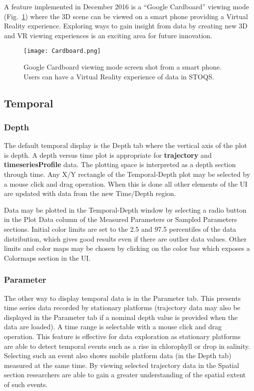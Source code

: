 \documentclass[conference]{IEEEtran}
\begin{document}
A feature implemented in December 2016 is a ``Google Cardboard'' viewing mode
(Fig.~\ref{fig:Cardboard}) where the 3D scene can be viewed on a smart phone providing a Virtual 
Reality experience. Exploring ways to gain insight from data by creating new
3D and VR viewing experiences is an exciting area for future innovation.

\begin{figure}[htbp]
\centering
\texttt{[image: Cardboard.png]}
\caption{Google Cardboard viewing mode screen shot from a smart phone. 
Users can have a Virtual Reality experience of data in STOQS.}
\label{fig:Cardboard}
\end{figure}

\subsection{Temporal}

\subsubsection{Depth}
The default temporal display is the Depth tab where the vertical axis of the plot 
is depth. A depth versus time plot is appropriate for \textbf{trajectory} and 
\textbf{timeseriesProfile} data. The plotting space is interpreted as a 
depth section through time. Any X/Y rectangle of the Temporal-Depth 
plot may be selected by a mouse click and drag operation. 
When this is done all other elements of the UI are updated with data 
from the new Time/Depth region.

Data may be plotted in the Temporal-Depth window by selecting a radio button
in the Plot Data column of the Measured Parameters or Sampled Parameters sections.
Initial color limits are set to the 2.5 and 97.5 percentiles of the data distribution,
which gives good results even if there are outlier data values. Other limits and
color maps may be chosen by clicking on the color bar which exposes a Colormaps section in the UI.

\subsubsection{Parameter}
The other way to display temporal data is in the Parameter tab.
This presents time series data recorded by stationary platforms
(trajectory data may also be displayed in the Parameter tab if a nominal
depth value is provided when the data are loaded).
A time range is selectable with a mouse click and drag operation. This 
feature is effective for data exploration as stationary platforms are able 
to detect temporal events such as a rise in chlorophyll or drop in salinity. 
Selecting such an event also shows mobile platform data (in the Depth tab) 
measured at the same time. By viewing selected trajectory data in the Spatial section 
researchers are able to gain a greater understanding of the spatial 
extent of such events.
\end{document}
